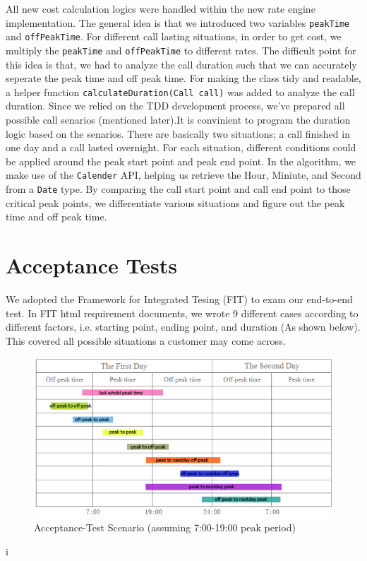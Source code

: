 \documentclass[a4paper,12pt,oneside,final]{article}
\newenvironment{changemargin}[2]{\begin{list}{}{%
\setlength{\topsep}{0pt}%
\setlength{\leftmargin}{0pt}%
\setlength{\rightmargin}{0pt}%
\setlength{\listparindent}{\parindent}%
\setlength{\itemindent}{\parindent}%
\setlength{\parsep}{0pt plus 1pt}%
\addtolength{\leftmargin}{#1}%
\addtolength{\rightmargin}{#2}%
}\item }{\end{list}}
\begin{document}
All new cost calculation logics were handled within the new rate engine implementation. The general idea is that we introduced two variables \verb+peakTime+ and \verb+offPeakTime+. For different call lasting situations, in order to get cost, we multiply the \verb+peakTime+ and \verb+offPeakTime+ to different rates. The difficult point for this idea is that, we had to analyze the call duration such that we can accurately seperate  the peak time and off peak time. For making the class tidy and readable, a helper function \verb+calculateDuration(Call call)+ was added to analyze the call duration. Since we relied on the TDD development process, we've prepared all possible call senarios (mentioned later).It is convinient to program the duration logic based on the senarios. There are basically two situations; a call finished in one day and a call lasted overnight. For each situation, different conditions could be applied around the peak start point and peak end point. In the algorithm, we make use of the \verb+Calender+ API, helping us retrieve the Hour, Miniute, and Second from a \verb+Date+ type.  By comparing the call start point and call end point to those critical peak points, we differentiate various situations and figure out the peak time and off peak time.


\section{Acceptance Tests} %
We adopted the Framework for Integrated Tesing (FIT) to exam our end-to-end test. In FIT html requirement documents, we wrote 9 different cases according to different factors, i.e. starting point, ending point, and duration (As shown below). This covered all possible situations a customer may come across.
\begin{figure}[!h]
\begin{changemargin}{-20mm}{-20mm}
\center
\includegraphics[scale=0.70]{fit-cases.png}
\caption{Acceptance-Test Scenario (assuming 7:00-19:00 peak period)}
\end{changemargin}
\end{figure}i 
\end{document}
